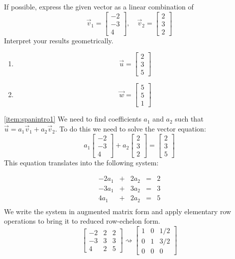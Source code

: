 \documentclass{ximera}
\begin{document}
\begin{example}\label{ex:spanintro}
If possible, express the given vector as a linear combination of $$\vec{v}_1=\begin{bmatrix}-2\\-3\\4\end{bmatrix},\quad\vec{v}_2=\begin{bmatrix}2\\3\\2\end{bmatrix}$$  Interpret your results geometrically.

  \begin{enumerate}
  \item \label{item:spanintro1} 
  $$\vec{u}=\begin{bmatrix}2\\3\\5\end{bmatrix}$$
  
  
  \item \label{item:spanintro2}
  $$\vec{w}=\begin{bmatrix}5\\5\\1\end{bmatrix}$$
  \end{enumerate}
  
  \begin{explanation}
  \ref{item:spanintro1} We need to find coefficients $a_1$ and $a_2$ such that $\vec{u}=a_1\vec{v}_1+a_2\vec{v}_2$. To do this we need to solve the vector equation:
  $$a_1\begin{bmatrix}-2\\-3\\4\end{bmatrix}+a_2\begin{bmatrix}2\\3\\2\end{bmatrix}=\begin{bmatrix}2\\3\\5\end{bmatrix}$$
  This equation translates into the following system:
  
  $$\begin{array}{ccccc}
      -2a_1 & +&2a_2&= &2 \\
        -3a_1& +&3a_2&= &3 \\
      4a_1 &+ &2a_2&= &5\\
	     \end{array}$$
  We write the system in augmented matrix form and apply elementary row operations to bring it to reduced row-echelon form.
  $$\left[\begin{array}{cc|c}  
 -2&2&2\\-3&3&3\\4&2&5
 \end{array}\right]\rightsquigarrow\left[\begin{array}{cc|c}  
 1&0&1/2\\0&1&3/2\\0&0&0
 \end{array}\right]$$
  

\end{explanation}
\end{example}
\end{document}
